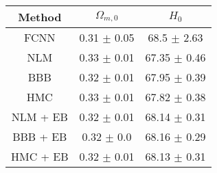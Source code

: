 \documentclass[convert={outext=.png}]{standalone}
\begin{document}
\centering
\label{tab:experimental_results}

\begin{tabular}{c c c}

\hline
\hline
Method & $\Omega_{m,0}$ & $H_0$ \\ \hline
 FCNN & 0.31 $\pm$ 0.05 & 68.5 $\pm$ 2.63 \\
 \hline
 NLM & 0.33 $\pm$ 0.01 & 67.35 $\pm$ 0.46 \\
 BBB & 0.32 $\pm$ 0.01 & 67.95 $\pm$ 0.39 \\
 HMC & 0.33 $\pm$ 0.01 & 67.82 $\pm$ 0.38 \\
 \hline
 NLM + EB & 0.32 $\pm$ 0.01 & 68.14 $\pm$ 0.31 \\
 BBB + EB & 0.32 $\pm$ 0.0 & 68.16 $\pm$ 0.29 \\
 HMC + EB & 0.32 $\pm$ 0.01 & 68.13 $\pm$ 0.31 \\
\hline
\hline
\end{tabular}
\end{document}
